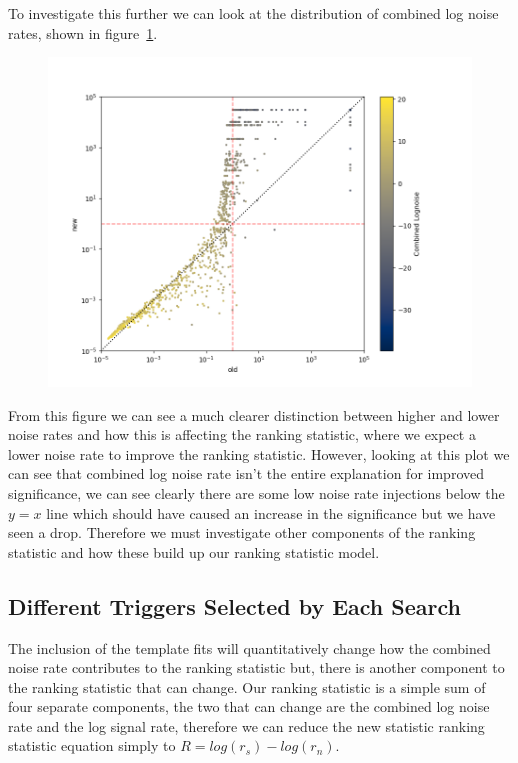 To investigate this further we can look at the distribution of combined log noise rates, shown in figure~\ref{fig:pycbclive-ifar-ifar-comb-log-noise-rate}.
%
\begin{figure}
  \centering
  \includegraphics[width=1\textwidth]{images/5_pycbclive/all_full_comb_lognoise.png}
  \caption{}
  \label{fig:pycbclive-ifar-ifar-comb-log-noise-rate}
\end{figure}
%
From this figure we can see a much clearer distinction between higher and lower noise rates and how this is affecting the ranking statistic, where we expect a lower noise rate to improve the ranking statistic. However, looking at this plot we can see that combined log noise rate isn't the entire explanation for improved significance, we can see clearly there are some low noise rate injections below the $y=x$ line which should have caused an increase in the significance but we have seen a drop. Therefore we must investigate other components of the ranking statistic and how these build up our ranking statistic model.

\subsection{\label{sec:pycbclive-diff-triggers}Different Triggers Selected by Each Search}


The inclusion of the template fits will quantitatively change how the combined noise rate contributes to the ranking statistic but, there is another component to the ranking statistic that can change. Our ranking statistic is a simple sum of four separate components, the two that can change are the combined log noise rate and the log signal rate, therefore we can reduce the new statistic ranking statistic equation simply to $R = log(r_s) - log(r_n)$.

